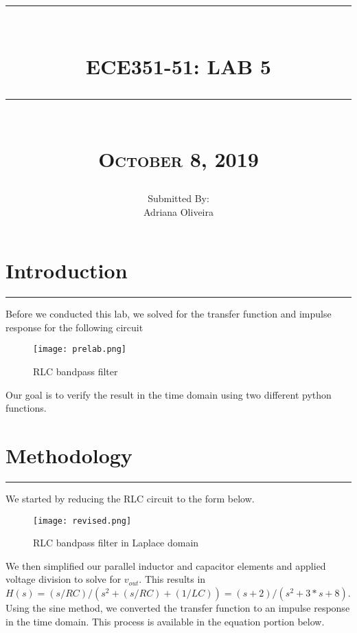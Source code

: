\documentclass[12pt]{report}
\newcommand{\HRule}[1]{\rule{\linewidth}{#1}}
\begin{document}
\title{ 
		\\ [2.0cm]
		\HRule{0.5pt} \\
		\LARGE \textbf{\uppercase{ECE351-51: Lab 5}} 
		\HRule{2pt} \\ [0.5cm]
		\normalsize\textsc{October 8, 2019} \vspace*{5\baselineskip}}

\date{}
\author{\normalsize
		Submitted By: \\
		\normalsize Adriana Oliveira\\}

\maketitle

\newpage

\sectionfont{\scshape}
\section*{Introduction}
\hrule
\vspace{1cm}
\setlength{\parindent}{5ex}
Before we conducted this lab, we solved for the transfer function and impulse response for the following circuit
\begin{figure}[htp]
    \centering
    \texttt{[image: prelab.png]}
    \caption{RLC bandpass filter}
    \label{fig:ghj}
\end{figure}

Our goal is to verify the result in the time domain using two different python functions.
\section*{Methodology}
\hrule
\vspace{1cm}
\setlength{\parindent}{5ex}
We started by reducing the RLC circuit to the form below.
\begin{figure}[htp]
    \centering
    \texttt{[image: revised.png]}
    \caption{RLC bandpass filter in Laplace domain}
    \label{fig:ghj}
\end{figure}

We then simplified our parallel inductor and capacitor elements and applied voltage division to solve for $v_{out}$. This results in $H(s) = (s/RC)/(s^{2}+(s/RC)+(1/LC)) = (s+2)/(s^{2}+3*s+8)$. Using the sine method, we converted the transfer function to an impulse response in the time domain. This process is available in the equation portion below. 
\end{document}
